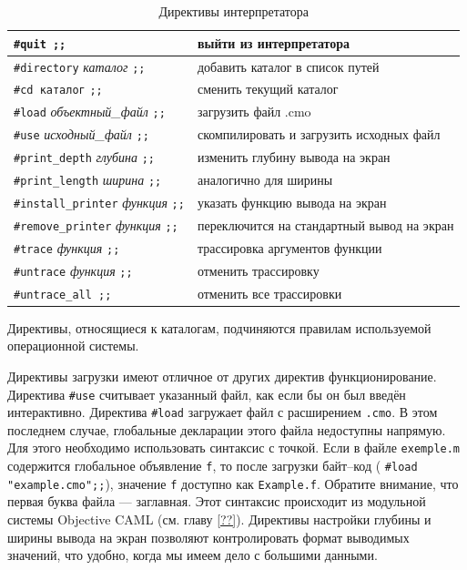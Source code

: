 \begin{table}[hc]
	\centering
	\caption{\label{tbl:toplevel_loop_directives}Директивы интерпретатора}
	\begin{tabular}{|l|l|}
	\hline
	\texttt{\#quit ;;} & выйти из интерпретатора \\
	\hline
	\texttt{\#directory} {\it каталог} \texttt{;;} & добавить каталог в список
путей \\
	\hline
	\texttt{\#cd каталог} \texttt{;;} & сменить текущий каталог \\
	\hline
	\texttt{\#load} {\it объектный\_файл} \texttt{;;} & загрузить файл .cmo \\
	\hline
	\texttt{\#use} {\it исходный\_файл} \texttt{;;} & скомпилировать и загрузить
исходных файл \\
	\hline
	\texttt{\#print\_depth} {\it глубина} \texttt{;;} & изменить глубину вывода
на экран \\
	\hline
	\texttt{\#print\_length} {\it ширина} \texttt{;;} & аналогично для ширины \\
	\hline
	\texttt{\#install\_printer} {\it функция} \texttt{;;} & указать функцию
вывода на экран \\
	\hline
	\texttt{\#remove\_printer} {\it функция} \texttt{;;} & переключится на
стандартный вывод на экран \\
	\hline
	\texttt{\#trace} {\it функция} \texttt{;;} & трассировка аргументов функции
\\
	\hline
	\texttt{\#untrace} {\it функция} \texttt{;;} & отменить трассировку \\
	\hline
	\texttt{\#untrace\_all ;;} & отменить все трассировки \\
	\hline
	\end{tabular}
\end{table}

Директивы, относящиеся к каталогам, подчиняются правилам используемой
операционной системы.

Директивы загрузки имеют отличное от других директив функционирование. Директива
\texttt{\#use} считывает указанный файл, как если бы он был введён интерактивно.
Директива \texttt{\#load} загружает файл с расширением \texttt{.cmo}. В этом
последнем случае, глобальные декларации этого файла недоступны напрямую. Для
этого необходимо использовать синтаксис с точкой. Если в файле
\texttt{exemple.m} содержится глобальное объявление \texttt{f}, то после
загрузки байт--код ( \texttt{\#load "example.cmo";;}), значение \texttt{f}
доступно как \texttt{Example.f}. Обратите внимание, что первая буква файла ---
заглавная. Этот синтаксис происходит из модульной системы Objective CAML (см.
главу \ref{??}). Директивы настройки глубины и ширины вывода на экран позволяют
контролировать формат выводимых значений, что удобно, когда мы имеем дело с
большими данными.

